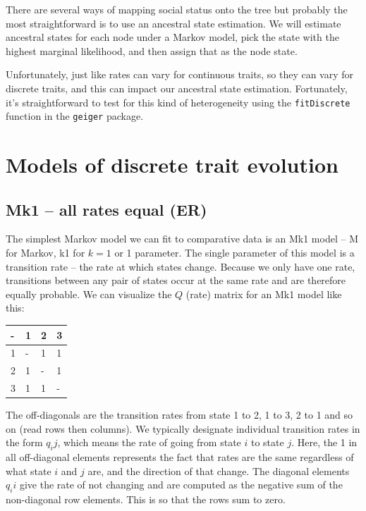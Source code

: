 \documentclass[]{book}
\theoremstyle{definition}
\theoremstyle{definition}
\theoremstyle{definition}
\theoremstyle{remark}
\begin{document}
There are several ways of mapping social status onto the tree but
probably the most straightforward is to use an ancestral state
estimation. We will estimate ancestral states for each node under a
Markov model, pick the state with the highest marginal likelihood, and
then assign that as the node state.

Unfortunately, just like rates can vary for continuous traits, so they
can vary for discrete traits, and this can impact our ancestral state
estimation. Fortunately, it's straightforward to test for this kind of
heterogeneity using the \texttt{fitDiscrete} function in the
\texttt{geiger} package.

\section{Models of discrete trait
evolution}\label{models-of-discrete-trait-evolution}

\subsection{Mk1 -- all rates equal (ER)}\label{mk1-all-rates-equal-er}

The simplest Markov model we can fit to comparative data is an Mk1 model
-- M for Markov, k1 for \(k = 1\) or 1 parameter. The single parameter
of this model is a transition rate -- the rate at which states change.
Because we only have one rate, transitions between any pair of states
occur at the same rate and are therefore equally probable. We can
visualize the \(Q\) (rate) matrix for an Mk1 model like this:

\begin{longtable}[]{@{}llll@{}}
\toprule
- & 1 & 2 & 3\tabularnewline
\midrule
\endhead
1 & - & 1 & 1\tabularnewline
2 & 1 & - & 1\tabularnewline
3 & 1 & 1 & -\tabularnewline
\bottomrule
\end{longtable}

The off-diagonals are the transition rates from state 1 to 2, 1 to 3, 2
to 1 and so on (read rows then columns). We typically designate
individual transition rates in the form \(q_ij\), which means the rate
of going from state \(i\) to state \(j\). Here, the 1 in all
off-diagonal elements represents the fact that rates are the same
regardless of what state \(i\) and \(j\) are, and the direction of that
change. The diagonal elements \(q_ii\) give the rate of not changing and
are computed as the negative sum of the non-diagonal row elements. This
is so that the rows sum to zero.
\end{document}
